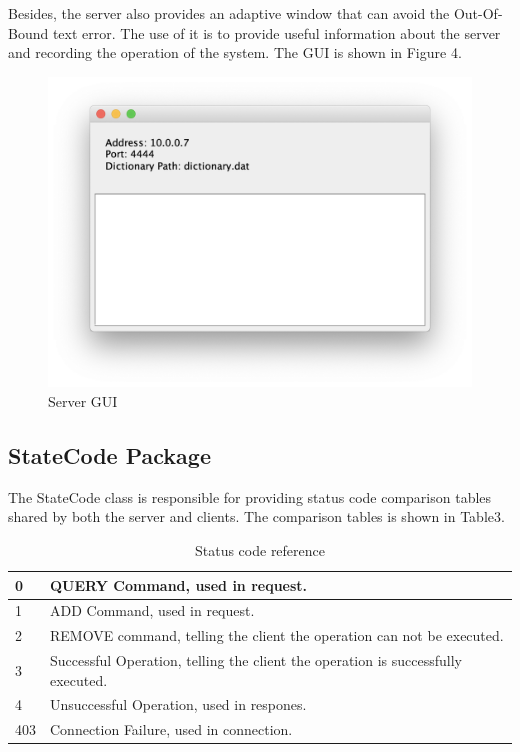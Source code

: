 \documentclass[a4paper]{article}
\begin{document}
Besides, the server also provides an adaptive window that can avoid the Out-Of-Bound text error. The use of it is to provide useful information about the server and recording the operation of the system. The GUI is shown in Figure 4.

\begin{figure}[H]
	\includegraphics[width=\linewidth]{serverGUI.png}
	\caption{Server GUI}
\end{figure}

\subsection{StateCode Package}
The StateCode class is responsible for providing status code comparison tables shared by both the server and clients. The comparison tables is shown in Table3.
\begin{table}[H]
	\caption{Status code reference}
	\begin{tabular}{|p{0.6cm}|p{10.7cm}|}
		\hline
		0 & QUERY Command, used in request.\\ \hline
		1 & ADD Command, used in request.   \\ \hline
		2 & REMOVE command, telling the client the operation can not be executed. \\ \hline
		3 & Successful Operation, telling the client the operation is successfully executed.\\ \hline
		4 & Unsuccessful Operation, used in respones.\\ \hline
		403 & Connection Failure, used in connection.\\ \hline
	\end{tabular}
\end{table}
\end{document}
